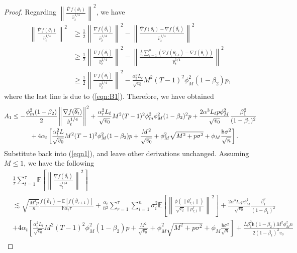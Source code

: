 \documentclass[11pt]{article}
\def\EE{\mathbb{E}}
\def\tot{\mathsf{h}}
\begin{document}
\begin{proof}
Regarding $\left\| \frac{\overline{\nabla}f(\theta_t)}{\hat v_t^{1/4}} \right\|^2$, we have
\begin{align*}
\left\| \frac{\overline{\nabla}f(\theta_t)}{\hat v_t^{1/4}} \right\|^2 & \geq \frac{1}{2} \left\| \frac{\nabla f(\overline{\theta_t})}{\hat v_t^{1/4}} \right\|^2 - \left\| \frac{\overline{\nabla}f(\theta_t)- \nabla f(\overline{\theta_t})}{\hat v_t^{1/4}} \right\|^2\\
& \geq \frac{1}{2} \left\| \frac{\nabla f(\overline{\theta_t})}{\hat v_t^{1/4}} \right\|^2 - \left\| \frac{\frac{1}{n}\sum_{i=1}^n (\nabla f(\theta_{t,i})-\nabla f(\bar\theta_i))}{\hat v_t^{1/4}} \right\|^2 \\
&\geq \frac{1}{2} \left\| \frac{\nabla f(\overline{\theta_t})}{\hat v_t^{1/4}} \right\|^2 - \frac{\alpha_t^2 L_\ell}{\sqrt{v_0}} M^2 (T-1)^2 \phi_M^2 (1-\beta_2)p,
\end{align*}
where the last line is due to (\ref{eqn:B1}). Therefore, we have obtained
\begin{align*}
    A_1&\leq -\frac{\phi_m^2(1-\beta_2)}{2}\left\| \frac{\nabla f(\overline{\theta_t})}{\hat v_t^{1/4}} \right\|^2+\frac{\alpha_r^2 L_\ell}{\sqrt{v_0}} M^2 (T-1)^2 \phi_m^2\phi_M^2 (1-\beta_2)^2p+\frac{2\alpha^3 L_\ell p\phi_M^2}{ \sqrt{v_0}}\frac{\beta_1^2}{(1-\beta_1)^2} \\
    &\hspace{0.4in}  + 4\alpha_t \left[ \frac{\alpha_t^2 L}{\sqrt{v_0}}  M^2 (T-1)^2 \phi_M^2 (1-\beta_2)p + \frac{M^2}{\sqrt{v_0}}+\phi_M^2\sqrt{M^2+p\sigma^2} + \phi_M \frac{\tot \sigma^2}{\sqrt{n}}\right].
\end{align*}
Substitute back into (\ref{eqn1}), and leave other derivations unchanged. Assuming $M\leq 1$, we have the following
\begin{align*}
    &\frac{1}{\tau}\sum_{t=1}^\tau  \EE\left[ \left\| \frac{\nabla f(\overline{\theta_t})}{\hat v_t^{1/4}}   \right \|^2 \right] \\
    & \lesssim  \sqrt{\frac{M^2 p}{n}} \frac{ f(\bar{\vartheta}_1)  - \EE[ f(\bar{\vartheta}_{\tau+1})]}{\tot \alpha_t \tau}+   \frac{\alpha_t}{n^2}  \sum_{r=1}^\tau  \sum_{i = 1}^n  \sigma_i^2 \EE\left[ \left\|\frac{\phi(\|\theta_{r,i}^{\ell}\|)}{\sqrt{v_t} \|p_{r,i}^{\ell}\|} \right\|^2 \right] +\frac{2\alpha^3 L_\ell p\phi_M^2}{ \sqrt{v_0}}\frac{\beta_1^2}{(1-\beta_1)^2} \nonumber\\
   &   +4\alpha_t \left[ \frac{\alpha_t^2 L_\ell}{\sqrt{v_0}}  M^2 (T-1)^2 \phi_M^2 (1-\beta_2)p + \frac{M^2}{\sqrt{v_0}}+\phi_M^2\sqrt{M^2+p\sigma^2} + \phi_M \frac{\tot \sigma^2}{\sqrt{n}}\right] + \frac{ \overline{L}\beta_1^2\tot(1-\beta_2)M^2 \phi^2_M n}{2(1-\beta_1)^2 v_0}   \nonumber \\

\end{align*}
\end{proof}
\end{document}

